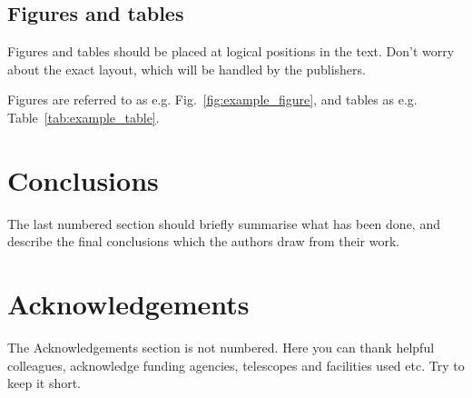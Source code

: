 \documentclass[a4paper,fleqn,usenatbib]{mnras}
\begin{document}
\subsection{Figures and tables}

Figures and tables should be placed at logical positions in the text. Don't
worry about the exact layout, which will be handled by the publishers.

Figures are referred to as e.g. Fig.~\ref{fig:example_figure}, and tables as
e.g. Table~\ref{tab:example_table}.




\section{Conclusions}

The last numbered section should briefly summarise what has been done, and describe
the final conclusions which the authors draw from their work.

\section*{Acknowledgements}

The Acknowledgements section is not numbered. Here you can thank helpful
colleagues, acknowledge funding agencies, telescopes and facilities used etc.
Try to keep it short.
\end{document}
